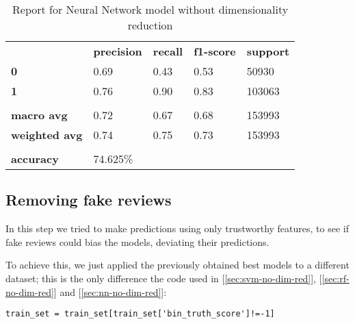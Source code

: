 \begin{table}[h!]
    \centering
    \begin{tabular}{lllll}
        \rowcolor[HTML]{EEEEEE} 
        \cellcolor[HTML]{FBFBFB} & \textbf{precision} & \textbf{recall} & \textbf{f1-score} & \textbf{support} \\
        \rowcolor[HTML]{EEEEEE} 
        \textbf{0}               & 0.69               & 0.43            & 0.53              & 50930            \\
        \rowcolor[HTML]{EEEEEE} 
        \textbf{1}               & 0.76               & 0.90            & 0.83              & 103063           \\
        \rowcolor[HTML]{FBFBFB} 
        &                    &                 &                   &                  \\
        \rowcolor[HTML]{EEEEEE} 
        \textbf{macro avg}       & 0.72               & 0.67            & 0.68              & 153993           \\
        \rowcolor[HTML]{EEEEEE} 
        \textbf{weighted avg}    & 0.74               & 0.75            & 0.73              & 153993           \\
        \rowcolor[HTML]{FBFBFB} 
        &                    &                 &                   &                  \\
        \rowcolor[HTML]{EEEEEE} 
        \textbf{accuracy}        & \multicolumn{4}{l}{\cellcolor[HTML]{EEEEEE}74.625\%}                         
    \end{tabular}
    \caption{Report for Neural Network model without dimensionality reduction}
    \label{tab:nn-res-no-dim-red}
\end{table}


\newpage
\subsection{Removing fake reviews} \label{sec:no-fake}

In this step we tried to make predictions using only trustworthy features, to see if fake reviews could bias the models, deviating their predictions.

To achieve this, we just applied the previously obtained best models to a different dataset; this is the only difference \wrt the code used in [\ref{sec:svm-no-dim-red}], [\ref{sec:rf-no-dim-red}] and [\ref{sec:nn-no-dim-red}]:
\begin{lstlisting}[caption={Removing fake reviews},label={lst:remove-fake-rev}]
    train_set = train_set[train_set['bin_truth_score']!=-1]
\end{lstlisting}

